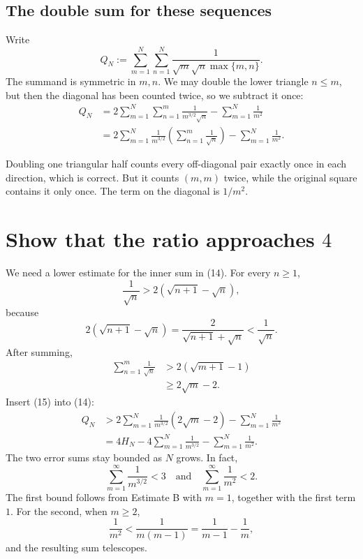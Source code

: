 \documentclass[11pt]{article}
\begin{document}
\subsection{The double sum for these sequences}

Write
\[
  Q_N:=\sum_{m=1}^{N}\sum_{n=1}^{N}
  \frac{1}{\sqrt m\sqrt n\max\{m,n\}}.
\]
The summand is symmetric in \(m,n\). We may double the lower triangle \(n\leq m\), but then the diagonal has been counted twice, so we subtract it once:
\[
\begin{aligned}
 Q_N
 &=2\sum_{m=1}^{N}\sum_{n=1}^{m}
 \frac{1}{m^{3/2}\sqrt n}
 -\sum_{m=1}^{N}\frac1{m^2}\\
 &=2\sum_{m=1}^{N}\frac1{m^{3/2}}
 \left(\sum_{n=1}^{m}\frac1{\sqrt n}\right)
 -\sum_{m=1}^{N}\frac1{m^2}.
\end{aligned}
\tag{14}
\]

\begin{warningBox}
Doubling one triangular half counts every off-diagonal pair exactly once in each direction, which is correct. But it counts \((m,m)\) twice, while the original square contains it only once. The term on the diagonal is \(1/m^2\).
\end{warningBox}

\section{Show that the ratio approaches \(4\)}

We need a lower estimate for the inner sum in (14). For every \(n\geq1\),
\[
  \frac1{\sqrt n}
  >2(\sqrt{n+1}-\sqrt n),
\]
because
\[
  2(\sqrt{n+1}-\sqrt n)
  =\frac2{\sqrt{n+1}+\sqrt n}
  <\frac1{\sqrt n}.
\]
After summing,
\[
\begin{aligned}
 \sum_{n=1}^{m}\frac1{\sqrt n}
 &>2(\sqrt{m+1}-1)\\
 &\geq2\sqrt m-2.
\end{aligned}
\tag{15}
\]
Insert (15) into (14):
\[
\begin{aligned}
 Q_N
 &>2\sum_{m=1}^{N}\frac1{m^{3/2}}(2\sqrt m-2)
 -\sum_{m=1}^{N}\frac1{m^2}\\
 &=4H_N
 -4\sum_{m=1}^{N}\frac1{m^{3/2}}
 -\sum_{m=1}^{N}\frac1{m^2}.
\end{aligned}
\tag{16}
\]
The two error sums stay bounded as \(N\) grows. In fact,
\[
  \sum_{m=1}^{\infty}\frac1{m^{3/2}}<3
  \quad\text{and}\quad
  \sum_{m=1}^{\infty}\frac1{m^2}<2.
  \tag{17}
\]
The first bound follows from Estimate B with \(m=1\), together with the first term \(1\). For the second, when \(m\geq2\),
\[
  \frac1{m^2}<\frac1{m(m-1)}
  =\frac1{m-1}-\frac1m,
\]
and the resulting sum telescopes.
\end{document}
